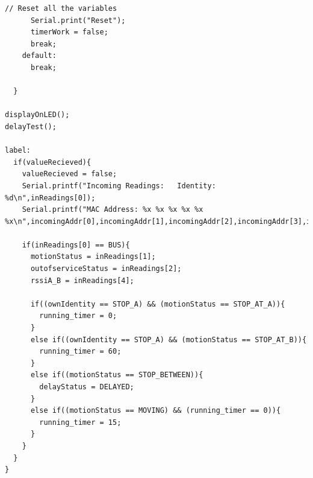 \documentclass[12pt]{article} %
\begin{document}
\begin{lstlisting}[style=myArduino]
      // Reset all the variables
      Serial.print("Reset");
      timerWork = false;
      break;
    default:
      break;
  
  }
  
displayOnLED();
delayTest();

label:
  if(valueRecieved){
    valueRecieved = false;
    Serial.printf("Incoming Readings:   Identity: %d\n",inReadings[0]);
    Serial.printf("MAC Address: %x %x %x %x %x %x\n",incomingAddr[0],incomingAddr[1],incomingAddr[2],incomingAddr[3],incomingAddr[4],incomingAddr[5]);

    if(inReadings[0] == BUS){
      motionStatus = inReadings[1];
      outofserviceStatus = inReadings[2];
      rssiA_B = inReadings[4];
    
      if((ownIdentity == STOP_A) && (motionStatus == STOP_AT_A)){
        running_timer = 0;
      }
      else if((ownIdentity == STOP_A) && (motionStatus == STOP_AT_B)){
        running_timer = 60;
      }
      else if((motionStatus == STOP_BETWEEN)){
        delayStatus = DELAYED;
      }
      else if((motionStatus == MOVING) && (running_timer == 0)){
        running_timer = 15;
      }
    }
  }
}
\end{lstlisting}
\end{document}
